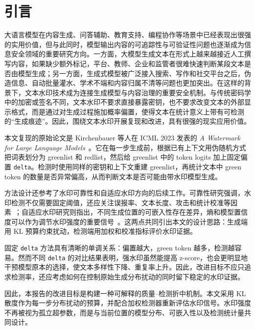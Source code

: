 \documentclass[a4paper,UTF8,zihao=5]{ctexart}
\begin{document}
\clearpage
{}
\tableofcontents
\clearpage
{}

\section{引言}

大语言模型在内容生成、问答辅助、教育支持、编程协作等场景中已经表现出很强的实用价值，但与此同时，模型输出内容的可追踪性与可验证性问题也逐渐成为信息安全领域的重要研究方向。一方面，大模型生成文本在形式上越来越接近人工撰写内容，如果缺少额外标记，平台、教师、企业和监管者很难快速判断某段文本是否由模型生成；另一方面，生成式模型被广泛接入搜索、写作和社交平台之后，伪造信息、自动批量灌水、学术不端和内容归属不清等问题也更加突出。在这样的背景下，文本水印技术成为连接生成模型与内容治理的重要安全机制。与传统密码学中的加密或签名不同，文本水印不要求直接暴露密钥，也不要求改变文本的外部显示格式，而是通过对生成过程施加概率偏置，使得文本在统计意义上带有可检测的“生成痕迹”。因此，围绕文本水印开展复现和改进，具有很强的现实应用价值。

本文复现的原始论文是 Kirchenbauer 等人在 ICML 2023 发表的 \textit{A Watermark for Large Language Models}~\cite{kirchenbauer2023watermark}。它在每一步生成前，根据已有上下文用伪随机方式把词表划分为 greenlist 和 redlist，然后给 greenlist 中的 token logits 加上固定偏置 \texttt{delta}。检测时使用同样的密钥和上下文重建 greenlist，再统计文本中 green token 的数量是否异常偏高，从而判断文本是否可能由带水印模型生成。

方法设计还参考了水印可靠性和自适应水印方向的后续工作。可靠性研究强调，水印检测不仅需要固定阈值，还应关注误报率、文本长度、攻击和统计校准等因素~\cite{kirchenbauer2024reliability}；自适应水印研究则指出，不同生成位置的可嵌入性存在差异，熵和模型置信度可以作为调节水印强度的重要信号~\cite{liu2024adaptive}。这两点共同引出本文的设计思路：生成端用 KL 预算约束扰动，检测端用加权和校准指标评价水印证据。

固定 \texttt{delta} 方法具有清晰的单调关系：偏置越大，green token 越多，检测越容易。然而不同 \texttt{delta} 的对比结果表明，强水印虽然能提高 z-score，也会更明显地干预模型原本的选择，使文本多样性下降、重复率上升。因此，改进目标不应只追求检测率，还应考虑如何在控制原始生成分布扰动的同时留下稳定的水印证据。

因此，本报告的改进目标是构建一种可解释的质量--检测折中机制。本文采用 KL 散度作为每一步分布扰动的预算，并配合加权检测器重新评估水印信号。水印强度不再被视为孤立超参数，而是与当前位置的模型分布、可嵌入性以及检测统计量共同设计。
\end{document}
